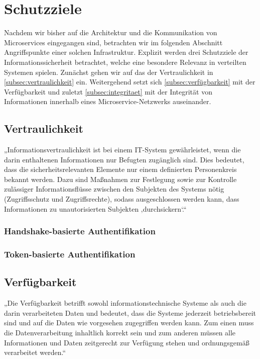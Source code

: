 \section{Schutzziele}
Nachdem wir bisher auf die Architektur und die Kommunikation von Microservices eingegangen sind, betrachten wir im folgenden Abschnitt Angriffspunkte einer solchen Infrastruktur. Explizit werden drei Schutzziele der Informationssicherheit betrachtet, welche eine besondere Relevanz in verteilten Systemen spielen. Zunächst gehen wir auf das der Vertraulichkeit in \autoref{subsec:vertraulichkeit} ein. Weitergehend setzt sich \autoref{subsec:verfügbarkeit} mit der Verfügbarkeit und zuletzt \autoref{subsec:integritaet} mit der Integrität von Informationen innerhalb eines Microservice-Netzwerks auseinander.


\subsection{Vertraulichkeit}
\label{subsec:vertraulichkeit}
„Informationsvertraulichkeit ist bei einem IT-System gewährleistet, wenn die darin enthaltenen Informationen nur Befugten zugänglich sind. Dies bedeutet, dass die sicherheitsrelevanten Elemente nur einem definierten Personenkreis bekannt werden. Dazu sind Maßnahmen zur Festlegung sowie zur Kontrolle zulässiger Informationsflüsse zwischen den Subjekten des Systems nötig (Zugriffsschutz und Zugriffsrechte), sodass ausgeschlossen werden kann, dass Informationen zu unautorisierten Subjekten ‚durchsickern‘.“ \cite{Bedner+10}

\subsubsection{Handshake-basierte Authentifikation}

\subsubsection{Token-basierte Authentifikation}


\subsection{Verfügbarkeit}
\label{subsec:verfügbarkeit}
„Die Verfügbarkeit betrifft sowohl informationstechnische Systeme als auch die darin verarbeiteten Daten und bedeutet, dass die Systeme jederzeit betriebsbereit sind und auf die Daten wie vorgesehen zugegriffen werden kann. Zum einen muss die Datenverarbeitung inhaltlich korrekt sein und zum anderen müssen alle Informationen und Daten zeitgerecht zur Verfügung stehen und ordnungsgemäß verarbeitet werden.“ \cite{Bedner+10}


